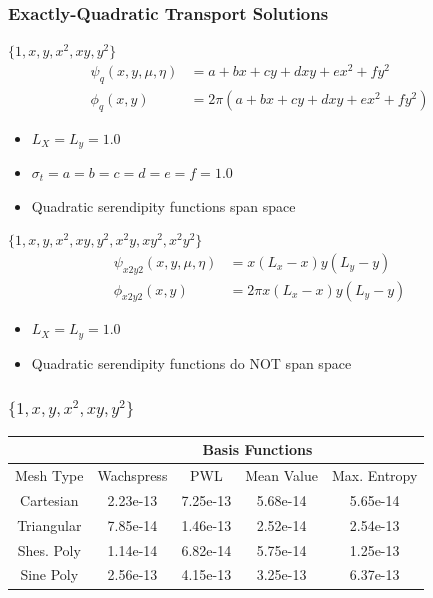 \documentclass[compress,10pt]{beamer}
\begin{document}
\begin{frame}[t]
{
\frametitle{Exactly-Quadratic Transport Solutions}
\begin{block}{$\{  1,x,y,x^2,xy,y^2 \}$}
\begin{equation*}
\begin{aligned}
\psi_q (x,y,\mu,\eta) &= a + bx + c y+ d xy + e x^2 + fy^2 \\
\phi_q (x,y) &= 2 \pi \left(  a + bx + c y+ d xy + e x^2 + fy^2 \right)
\end{aligned} 
\end{equation*}
\begin{itemize}
\item $L_X=L_y=1.0$
\item $\sigma_t=a=b=c=d=e=f=1.0$
\item Quadratic serendipity functions span space
\end{itemize}
\end{block}
\begin{block}{$\{  1,x,y,x^2,xy,y^2,x^2 y, x y^2, x^2 y^2 \}$}
\begin{equation*}
\begin{aligned}
\psi_{x2y2} (x,y,\mu,\eta) &= x \left(L_x - x \right) y \left(L_y - y \right) \\
\phi_{x2y2} (x,y) &= 2 \pi x \left(L_x - x \right) y \left(L_y - y \right) 
\end{aligned} 
\end{equation*}
\begin{itemize}
\item $L_X=L_y=1.0$
\item Quadratic serendipity functions do NOT span space
\end{itemize}
\end{block}
}
{
\frametitle{$\{  1,x,y,x^2,xy,y^2 \}$}
\centering
\begin{table}
\begin{center}
\def\arraystretch{1.6}
\begin{tabular}{|c|c|c|c|c|}
\hline
& \multicolumn{4}{c}{Basis Functions}\vline\\
\hline
Mesh Type & Wachspress & PWL& Mean Value& Max. Entropy \\
\hline
Cartesian&2.23e-13&7.25e-13&5.68e-14&5.65e-14\\
Triangular&7.85e-14&1.46e-13&2.52e-14&2.54e-13\\
Shes. Poly&1.14e-14&6.82e-14&5.75e-14&1.25e-13\\
Sine Poly&2.56e-13&4.15e-13&3.25e-13&6.37e-13\\

\end{tabular}
\end{center}
\end{table}}
\end{frame}
\end{document}
